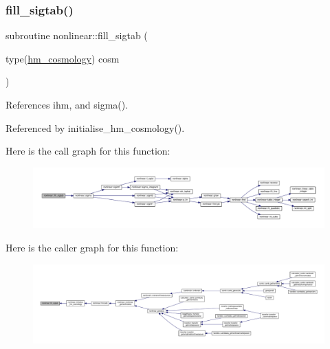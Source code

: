 \subsubsection{\texorpdfstring{fill\+\_\+sigtab()}{fill\_sigtab()}}
{\footnotesize\ttfamily subroutine nonlinear\+::fill\+\_\+sigtab (\begin{DoxyParamCaption}\item[{type(\mbox{\hyperlink{structnonlinear_1_1hm__cosmology}{hm\+\_\+cosmology}})}]{cosm }\end{DoxyParamCaption})\hspace{0.3cm}{\ttfamily [private]}}



References ihm, and sigma().



Referenced by initialise\+\_\+hm\+\_\+cosmology().

Here is the call graph for this function\+:
\nopagebreak
\begin{figure}[H]
\begin{center}
\leavevmode
\includegraphics[width=350pt]{namespacenonlinear_a0ec694303c1335ceb97e09d20f0ceb94_cgraph}
\end{center}
\end{figure}
Here is the caller graph for this function\+:
\nopagebreak
\begin{figure}[H]
\begin{center}
\leavevmode
\includegraphics[width=350pt]{namespacenonlinear_a0ec694303c1335ceb97e09d20f0ceb94_icgraph}
\end{center}
\end{figure}
\mbox{\label{namespacenonlinear_a6ac027990c6d758a7c5420da7001dfc7}} 
